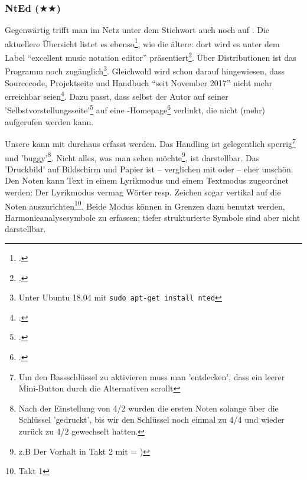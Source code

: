 %
%
%



\subsubsection{NtEd ($\bigstar$$\bigstar$)}
 
Gegenwärtig trifft man im Netz unter dem Stichwort  auch
noch auf . Die aktuellere Übersicht listet es
ebenso\footcite[vgl.][\nopage wp]{WpedNotensatz2019a}, wie die ältere: dort wird
es unter dem Label \enquote{excellent music notation editor}
präsentiert\footcite[vgl.][\nopage wp]{LinuxSoundNotation2006a}. Über
Distributionen ist das Programm noch zugänglich\footnote{Unter Ubuntu 18.04 mit
\texttt{sudo apt-get install nted}}. Gleichwohl wird schon darauf hingewiesen,
dass Sourcecode, Projektseite und Handbuch \enquote{seit November 2017} nicht
mehr erreichbar seien\footcite[vgl.][\nopage wp]{UbuntuNtEd2016a}.
Dazu passt, dass selbst der Autor  auf seiner
'Selbstvorstellungsseite'\footcite[vgl.][\nopage wp]{Andres2018a} auf eine
-Homepage\footcite[vgl.][\nopage wp]{Andres2018b} verlinkt, die nicht
(mehr) aufgerufen werden kann.
 
Unsere  kann mit  durchaus erfasst werden. Das
Handling ist gelegentlich sperrig\footnote{Um den Bassschlüssel zu aktivieren
muss man 'entdecken', dass ein leerer Mini-Button durch die Alternativen
scrollt} und 'buggy'\footnote{Nach der Einstellung von 4/2 wurden die ersten
Noten solange über die Schlüssel 'gedruckt', bis wir den Schlüssel noch einmal
zu 4/4 und wieder zurück zu 4/2 gewechselt hatten.}. Nicht alles, was man sehen
möchte\footnote{z.B Der Vorhalt in Takt 2 mit \Halb = \Vier \Vier)}, ist
darstellbar. Das 'Druckbild' auf Bildschirm und Papier ist -- verglichen mit
 oder  -- eher unschön. Den Noten kann Text in
einem Lyrikmodus und einem Textmodus zugeordnet werden: Der Lyrikmodus vermag
Wörter resp. Zeichen sogar vertikal auf die Noten auszurichten\footnote{Takt 1}.
Beide Modus können in Grenzen dazu benutzt werden, Harmonieanalysesymbole zu
erfassen; tiefer strukturierte Symbole sind aber nicht darstellbar.

